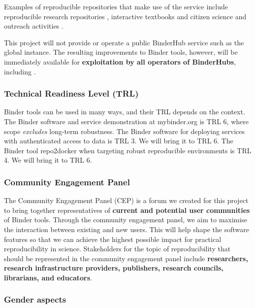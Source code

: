 Examples of reproducible repositories that make use of the \mybinder{} service
include reproducible research repositories
\cite{GitHubRepoExampleAlbert2016,Beg2021}, interactive textbooks
\cite{Fangohr2022,Zeller2022} and citizen science and outreach activities
\cite{ligo-open-science,OSCOVIDA2022}.

This \TheProject{} project will not provide or operate a public BinderHub service such as the global
\mybinder{} instance. The resulting improvements to Binder tools, however, will be
immediately available for \textbf{exploitation by all operators of BinderHubs}, including \mybinder{}.


\subsubsection{Technical Readiness Level (TRL)}

Binder tools can be used in many ways, and their TRL depends on the context. 
The Binder software and service demonstration at mybinder.org is TRL 6,
where scope \emph{excludes} long-term robustness.
The Binder software for deploying services with authenticated access to data is TRL 3.
We will bring it to TRL 6.
The Binder tool repo2docker when targeting robust reproducible environments is TRL 4.
We will bring it to TRL 6.


\subsubsection{Community Engagement Panel}\label{sec:community-engagement-panel}
The Community Engagement Panel (CEP) is a forum we created for this project to bring together
representatives of \textbf{current and potential user communities} of Binder tools.
Through the community engagement panel, we aim to maximise the interaction between existing and new users.
This will help shape the software features so that we can
achieve the highest possible impact for practical reproducibility in science.
Stakeholders for the topic of reproducibility that should be represented in the
community engagement panel include \textbf{researchers, research infrastructure
providers, publishers, research councils, librarians, and educators}.



\subsubsection{Gender aspects}\label{sec:gender}


